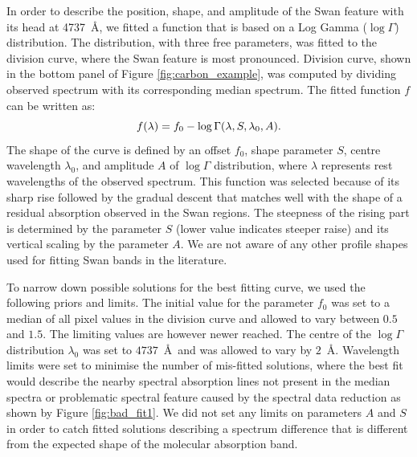 In order to describe the position, shape, and amplitude of the Swan feature with its head at 4737~\AA, we fitted a function that is based on a Log Gamma ($\log{}\Gamma$) distribution. The distribution, with three free parameters, was fitted to the division curve, where the Swan feature is most pronounced. Division curve, shown in the bottom panel of Figure \ref{fig:carbon_example}, was computed by dividing observed spectrum with its corresponding median spectrum. The fitted function $f$ can be written as:
\begin{equation}
\centering
f(\lambda) = f_0 - \log{}\Gamma(\lambda, S, \lambda_0, A).
\label{equ:loggamma}
\end{equation}
The shape of the curve is defined by an offset $f_0$, shape parameter $S$, centre wavelength $\lambda_0$, and amplitude $A$ of $\log{}\Gamma$ distribution, where $\lambda$ represents rest wavelengths of the observed spectrum. This function was selected because of its sharp rise followed by the gradual descent that matches well with the shape of a residual absorption observed in the Swan regions. The steepness of the rising part is determined by the parameter $S$ (lower value indicates steeper raise) and its vertical scaling by the parameter $A$. We are not aware of any other profile shapes used for fitting Swan bands in the literature.

To narrow down possible solutions for the best fitting curve, we used the following priors and limits. The initial value for the parameter $f_0$ was set to a median of all pixel values in the division curve and allowed to vary between $0.5$ and $1.5$. The limiting values are however newer reached. The centre of the $\log{}\Gamma$ distribution $\lambda_0$ was set to $4737$~\AA\ and was allowed to vary by $2$~\AA. Wavelength limits were set to minimise the number of mis-fitted solutions, where the best fit would describe the nearby spectral absorption lines not present in the median spectra or problematic spectral feature caused by the spectral data reduction as shown by Figure \ref{fig:bad_fit1}. We did not set any limits on parameters $A$ and $S$ in order to catch fitted solutions describing a spectrum difference that is different from the expected shape of the molecular absorption band.

